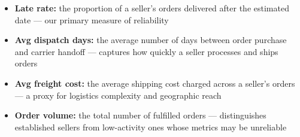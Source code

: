 \documentclass[
]{article}
\providecommand{\tightlist}{%
  \setlength{\itemsep}{0pt}\setlength{\parskip}{0pt}}
\begin{document}
\begin{itemize}
\tightlist
\item
  \textbf{Late rate:} the proportion of a seller's orders delivered
  after the estimated date --- our primary measure of reliability
\item
  \textbf{Avg dispatch days:} the average number of days between order
  purchase and carrier handoff --- captures how quickly a seller
  processes and ships orders
\item
  \textbf{Avg freight cost:} the average shipping cost charged across a
  seller's orders --- a proxy for logistics complexity and geographic
  reach
\item
  \textbf{Order volume:} the total number of fulfilled orders ---
  distinguishes established sellers from low-activity ones whose metrics
  may be unreliable
\end{itemize}
\end{document}

